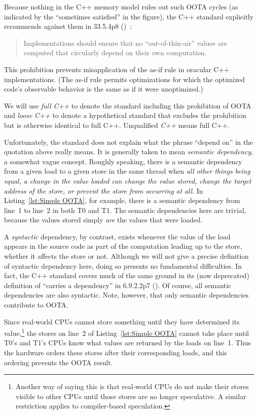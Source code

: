 Because nothing in the C++ memory model rules out such OOTA cycles
(as indicated by the ``sometimes satisfied'' in the figure), the C++
standard explicitly recommends against them in 33.5.4p8
()~\cite{ThomasKoeppe2023N4950}:
\begin{quote}
	Implementations should ensure that no ``out-of-thin-air'' values
	are computed that circularly depend on their own computation.
\end{quote}
This prohibition prevents misapplication of the as-if rule in oracular
C++ implementations.
(The as-if rule permits optimizations for which the optimized code's
observable behavior is the same as if it were unoptimized.)

We will use \emph{full C++} to denote the standard including this
prohibition of OOTA and \emph{loose C++} to denote a hypothetical standard
that excludes the prohibition but is otherwise identical to full C++.
Unqualified \emph{C++} means full C++.

Unfortunately, the standard does not explain what the phrase ``depend on''
in the quotation above really means.
It is generally taken to mean \emph{semantic dependency},
a somewhat vague concept.
Roughly speaking, there is a semantic dependency from a given load to
a given store in the same thread when
\emph{all other things being equal, a change in the
value loaded can change the value stored, change the target address of
the store, or prevent the store from occurring at all.}
In Listing~\ref{lst:Simple OOTA}, for example,
there is a semantic dependency from line~1 to line~2 in both T0 and T1.
The semantic dependencies here are trivial,
because the values stored simply \emph{are} the values that were loaded.

A \emph{syntactic} dependency, by contrast, exists whenever the value
of the load appears in the source code as part of the computation
leading up to the store, whether it affects the store or not.
Although we will not give a precise definition of syntactic dependency
here, doing so presents no fundamental difficulties.
In fact, the C++ standard covers much of the same ground in its
(now deprecated) definition
of ``carries a dependency'' in 6.9.2.2p7 ().
Of course, all semantic dependencies are also syntactic.
Note, however, that only semantic dependencies contribute to OOTA.

Since real-world CPUs cannot store something
until they have determined its value,\footnote{
	Another way of saying this is that real-world CPUs do not
	make their stores visible to other CPUs until those stores
	are no longer speculative.
	A similar restriction applies to compiler-based speculation.}
the stores on line~2 of Listing~\ref{lst:Simple OOTA}
cannot take place until T0's and T1's CPUs
know what values are returned by the loads on line~1.
Thus the hardware orders these stores after their corresponding loads,
and this ordering prevents the OOTA result.

